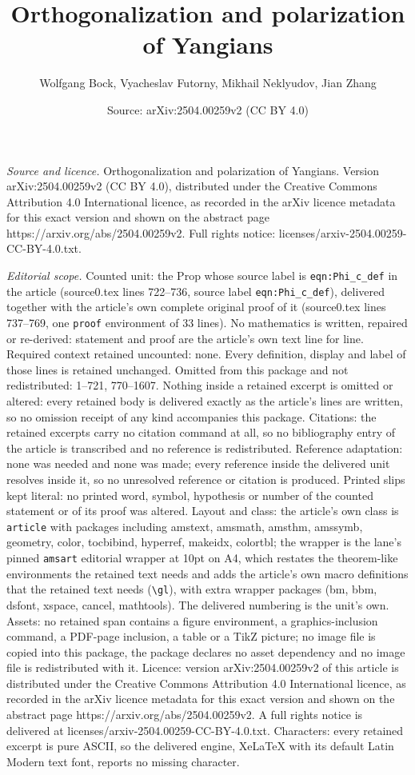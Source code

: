\documentclass[10pt,a4paper]{amsart}
\title[Orthogonalization and polarization of Yangians]{Orthogonalization and polarization of Yangians}
\author{Wolfgang Bock, Vyacheslav Futorny, Mikhail Neklyudov, Jian Zhang}
\date{Source: arXiv:2504.00259v2 (CC BY 4.0)}
\begin{document}
\maketitle

\noindent\emph{Source and licence.} Orthogonalization and polarization of Yangians. Version arXiv:2504.00259v2 (CC BY 4.0), distributed under the Creative Commons Attribution 4.0 International licence, as recorded in the arXiv licence metadata for this exact version and shown on the abstract page https://arxiv.org/abs/2504.00259v2. Full rights notice: licenses/arxiv-2504.00259-CC-BY-4.0.txt.\par\smallskip

\noindent\textit{Editorial scope.} Counted unit: the Prop whose source label is \texttt{eqn:Phi\_c\_def} in the article (source0.tex lines 722--736, source label \texttt{eqn:Phi\_c\_def}), delivered together with the article's own complete original proof of it (source0.tex lines 737--769, one \texttt{proof} environment of 33 lines). No mathematics is written, repaired or re-derived: statement and proof are the article's own text line for line. Required context retained uncounted: none. Every definition, display and label of those lines is retained unchanged. Omitted from this package and not redistributed: 1--721, 770--1607. Nothing inside a retained excerpt is omitted or altered: every retained body is delivered exactly as the article's lines are written, so no omission receipt of any kind accompanies this package. Citations: the retained excerpts carry no citation command at all, so no bibliography entry of the article is transcribed and no reference is redistributed. Reference adaptation: none was needed and none was made; every reference inside the delivered unit resolves inside it, so no unresolved reference or citation is produced. Printed slips kept literal: no printed word, symbol, hypothesis or number of the counted statement or of its proof was altered. Layout and class: the article's own class is \texttt{article} with packages including amstext, amsmath, amsthm, amssymb, geometry, color, tocbibind, hyperref, makeidx, colortbl; the wrapper is the lane's pinned \texttt{amsart} editorial wrapper at 10pt on A4, which restates the theorem-like environments the retained text needs and adds the article's own macro definitions that the retained text needs (\texttt{\textbackslash gl}), with extra wrapper packages (bm, bbm, dsfont, xspace, cancel, mathtools). The delivered numbering is the unit's own. Assets: no retained span contains a figure environment, a graphics-inclusion command, a PDF-page inclusion, a table or a TikZ picture; no image file is copied into this package, the package declares no asset dependency and no image file is redistributed with it. Licence: version arXiv:2504.00259v2 of this article is distributed under the Creative Commons Attribution 4.0 International licence, as recorded in the arXiv licence metadata for this exact version and shown on the abstract page https://arxiv.org/abs/2504.00259v2. A full rights notice is delivered at licenses/arxiv-2504.00259-CC-BY-4.0.txt. Characters: every retained excerpt is pure ASCII, so the delivered engine, XeLaTeX with its default Latin Modern text font, reports no missing character.
\end{document}
